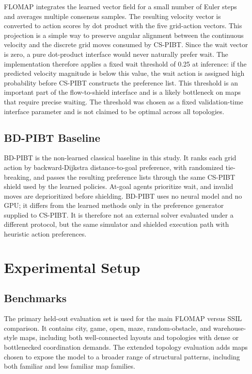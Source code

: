 \documentclass[conference]{IEEEtran}
\begin{document}
FLOMAP integrates the learned vector field for a small number of
Euler steps and averages multiple consensus samples.  The resulting velocity
vector is converted to action scores by dot product with the five grid-action
vectors.  This projection is a simple way to preserve angular alignment between
the continuous velocity and the discrete grid moves consumed by CS-PIBT.  Since
the wait vector is zero, a pure dot-product interface would never naturally
prefer wait.  The implementation therefore applies a fixed wait threshold of
0.25 at inference: if the predicted velocity magnitude is below this value, the
wait action is assigned high probability before CS-PIBT constructs the
preference list.  This threshold is an important part of the flow-to-shield
interface and is a likely bottleneck on maps that require precise waiting.  The
threshold was chosen as a fixed validation-time interface parameter and is not
claimed to be optimal across all topologies.

\subsection{BD-PIBT Baseline}

BD-PIBT is the non-learned classical baseline in this study.  It ranks each
grid action by backward-Dijkstra distance-to-goal preference, with randomized
tie-breaking, and passes the resulting preference lists through the same
CS-PIBT shield used by the learned policies.  At-goal agents prioritize wait,
and invalid moves are deprioritized before shielding.  BD-PIBT uses no neural
model and no GPU; it differs from the learned methods only in the preference
generator supplied to CS-PIBT.  It is therefore not an external solver evaluated
under a different protocol, but the same simulator and shielded execution path
with heuristic action preferences.

\section{Experimental Setup}

\subsection{Benchmarks}

The primary held-out evaluation set is used for the main FLOMAP versus
SSIL comparison.  It contains city, game, open, maze, random-obstacle, and
warehouse-style maps, including both well-connected layouts and topologies with
dense or bottlenecked coordination demands.  The extended topology evaluation
adds maps chosen to expose the model to a broader range of structural patterns,
including both familiar and less familiar map families.
\end{document}

